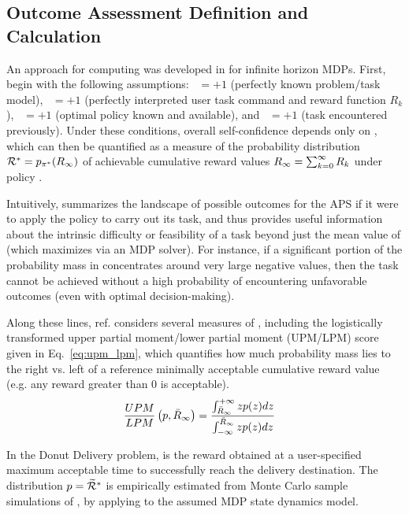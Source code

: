 \subsection{Outcome Assessment Definition and Calculation} \label{sec:xO}
An approach for computing \xO{} was developed in \cite{Aitken2016-cv} for infinite horizon MDPs. First, begin with the following assumptions: \xM~$=+1$ (perfectly known problem/task model), \xI~$= +1$ (perfectly interpreted user task command and reward function $R_k$), \xQ~$=+1$ (optimal policy \piopt{} known and available), and \xP~$=+1$ (task encountered previously). Under these conditions, overall self-confidence depends only on \xO{}, which can then be quantified as a measure of the probability distribution  $\mathcal{R}^* = p_{\pi^*}(R_{\infty})$ of achievable cumulative reward values $R_{\infty}= \sum_{k=0}^{\infty}R_{k}$ under policy \piopt.

Intuitively, \rwdopt{} summarizes the landscape of possible outcomes for the APS if it were to apply the policy \piopt{} to carry out its task, and thus provides useful information about the intrinsic difficulty or feasibility of a task beyond just the mean value of \ri{} (which \piopt{} maximizes via an MDP solver). For instance, if a significant portion of the probability mass in \rwdopt{} concentrates around very large negative values, then the task cannot be achieved without a high probability of encountering unfavorable outcomes (even with optimal decision-making). 

Along these lines, ref. \cite{Aitken2016-cv} considers several measures of \rwdopt, including the logistically transformed upper partial moment/lower partial moment (UPM/LPM) score given in Eq.~\ref{eq:upm_lpm}, which quantifies how much probability mass lies to the right vs. left of a reference minimally acceptable cumulative reward value \ris{} (e.g. any reward greater than 0 is acceptable).
    \begin{align}
        \frac{UPM}{LPM}\left(p,\riref\right) &= \frac{\int_{\riref}^{+\infty}zp(z)dz}{\int_{-\infty}^{\riref} zp(z)dz} \label{eq:upm_lpm}
    \end{align}

In the Donut Delivery problem, \riref{} is the reward obtained at a user-specified maximum acceptable time to successfully reach the delivery destination. The distribution $p = \widetilde{\mathcal{R}}^*$ is empirically estimated from Monte Carlo sample simulations of \rwdopt, by applying \piopt{} to the assumed MDP state dynamics model.

